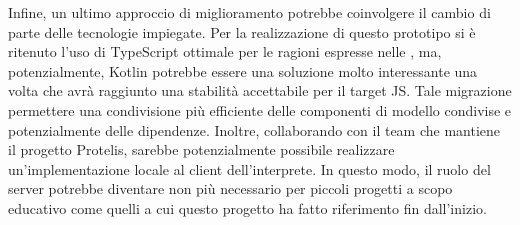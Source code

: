   Infine, un ultimo approccio di miglioramento potrebbe coinvolgere il cambio di parte delle tecnologie impiegate.
  Per la realizzazione di questo prototipo si è ritenuto l'uso di TypeScript ottimale per le ragioni espresse nelle ,
  ma, potenzialmente, Kotlin potrebbe essere una soluzione molto interessante una volta che avrà raggiunto una stabilità accettabile per il target JS\@.
  Tale migrazione permettere una condivisione più efficiente delle componenti di modello condivise e potenzialmente delle dipendenze.
  Inoltre, collaborando con il team che mantiene il progetto Protelis, sarebbe potenzialmente possibile realizzare un'implementazione locale al client dell'interprete.
  In questo modo, il ruolo del server potrebbe diventare non più necessario per piccoli progetti a scopo educativo come quelli a cui questo progetto ha fatto riferimento fin dall'inizio.
